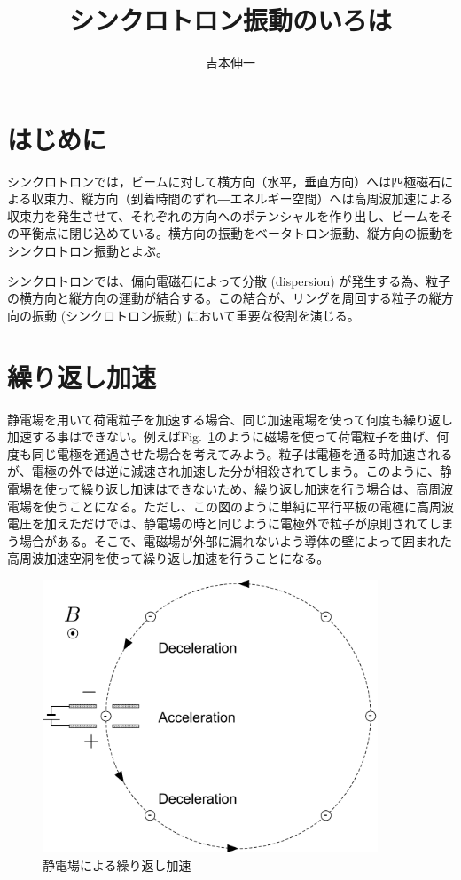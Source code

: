 \documentclass[10pt,a4paper]{ltjsarticle}
\begin{document}
\title{シンクロトロン振動のいろは}
\author{吉本伸一}
\maketitle
\tableofcontents
\clearpage

\section{はじめに}
シンクロトロンでは，ビームに対して横方向（水平，垂直方向）へは四極磁石による収束力、縦方向（到着時間のずれ―エネルギー空間）へは高周波加速による収束力を発生させて、それぞれの方向へのポテンシャルを作り出し、ビームをその平衡点に閉じ込めている。横方向の振動をベータトロン振動、縦方向の振動をシンクロトロン振動とよぶ。

シンクロトロンでは、偏向電磁石によって分散 (dispersion) が発生する為、粒子の横方向と縦方向の運動が結合する。この結合が、リングを周回する粒子の縦方向の振動 (シンクロトロン振動) において重要な役割を演じる。

\section{繰り返し加速}
静電場を用いて荷電粒子を加速する場合、同じ加速電場を使って何度も繰り返し加速する事はできない。例えばFig.~\ref{dc_circular}のように磁場を使って荷電粒子を曲げ、何度も同じ電極を通過させた場合を考えてみよう。粒子は電極を通る時加速されるが、電極の外では逆に減速され加速した分が相殺されてしまう。このように、静電場を使って繰り返し加速はできないため、繰り返し加速を行う場合は、高周波電場を使うことになる。ただし、この図のように単純に平行平板の電極に高周波電圧を加えただけでは、静電場の時と同じように電極外で粒子が原則されてしまう場合がある。そこで、電磁場が外部に漏れないよう導体の壁によって囲まれた高周波加速空洞を使って繰り返し加速を行うことになる。

\begin{figure}[hbt]
  \begin{center}
    \includegraphics[width=10cm,clip]{dc_circular.pdf}
    \caption{静電場による繰り返し加速}
   \label{dc_circular}
  \end{center}
\end{figure}
\end{document}
